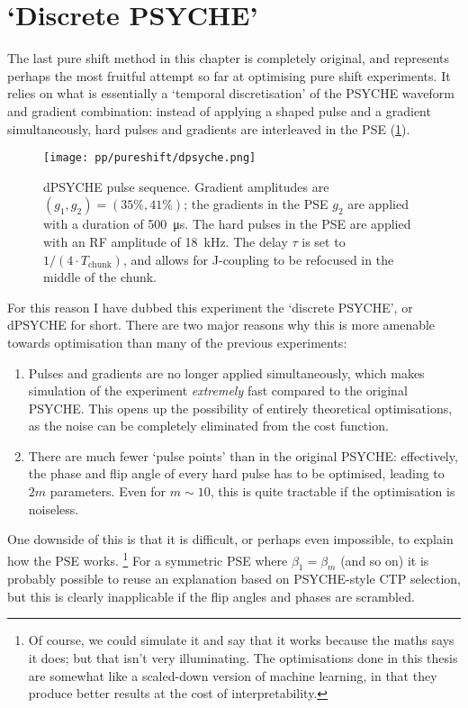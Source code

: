\section{`Discrete PSYCHE'}
\label{sec:pureshift__dpsyche}

The last pure shift method in this chapter is completely original, and represents perhaps the most fruitful attempt so far at optimising pure shift experiments.
It relies on what is essentially a `temporal discretisation' of the PSYCHE waveform and gradient combination: instead of applying a shaped pulse and a gradient simultaneously, hard pulses and gradients are interleaved in the PSE (\cref{fig:dpsyche_pulseq}).

\begin{figure}[htb]
    \centering
    \texttt{[image: pp/pureshift/dpsyche.png]}
    \caption[dPSYCHE pulse sequence]{
        dPSYCHE pulse sequence.
        Gradient amplitudes are $(g_1, g_2) = (35\%, 41\%)$; the gradients in the PSE $g_2$ are applied with a duration of \SI{500}{\us}.
        The hard pulses in the PSE are applied with an RF amplitude of \SI{18}{\kHz}.
        The delay $\tau$ is set to $1/(4 \cdot T_\text{chunk})$, and allows for J-coupling to be refocused in the middle of the chunk.
    }
    \label{fig:dpsyche_pulseq}
\end{figure}

For this reason I have dubbed this experiment the `discrete PSYCHE', or dPSYCHE for short.
There are two major reasons why this is more amenable towards optimisation than many of the previous experiments:
\begin{enumerate}
    \item Pulses and gradients are no longer applied simultaneously, which makes simulation of the experiment \textit{extremely} fast compared to the original PSYCHE.
        This opens up the possibility of entirely theoretical optimisations, as the noise can be completely eliminated from the cost function.
        
    \item There are much fewer `pulse points' than in the original PSYCHE: effectively, the phase and flip angle of every hard pulse has to be optimised, leading to $2m$ parameters.
        Even for $m \sim 10$, this is quite tractable if the optimisation is noiseless.
\end{enumerate}

One downside of this is that it is difficult, or perhaps even impossible, to explain how the PSE works.%
\footnote{Of course, we could simulate it and say that it works because the maths says it does; but that isn't very illuminating. The optimisations done in this thesis are somewhat like a scaled-down version of machine learning, in that they produce better results at the cost of interpretability.}
For a symmetric PSE where $\beta_1 = \beta_m$ (and so on) it is probably possible to reuse an explanation based on PSYCHE-style CTP selection, but this is clearly inapplicable if the flip angles and phases are scrambled.



